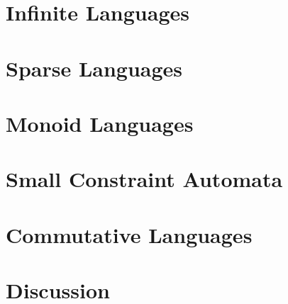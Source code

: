 


\section{Infinite Languages}
\label{sec:constr_sync:infinite}



\section{Sparse Languages}
\label{sec:constr_sync:letter_bounded}



\section{Monoid Languages}
\label{constr_sync:sec:monoid}



\section{Small Constraint Automata}
\label{sec:constr_sync:small_aut}



\section{Commutative Languages}
\label{sec:constr_sync:commutative}



\section{Discussion} 
\label{constrsync:sec:classes:discussion}

